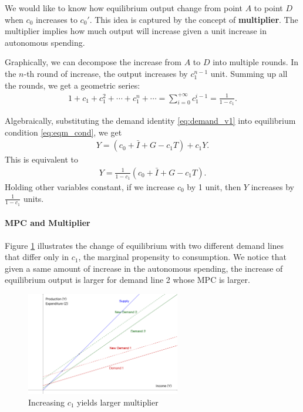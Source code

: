 \documentclass[12pt]{article}
\begin{document}
We would like to know how equilibrium output change from point $A$ to point $D$ when $c_0$ increases to $c_0'$. This idea is captured by the concept of \textbf{multiplier}. The multiplier implies how much output will increase given a unit increase in autonomous spending. 

Graphically, we can decompose the increase from $A$ to $D$ into multiple rounds. In the $n$-th round of increase, the output increases by $c_1^{n-1}$ unit. Summing up all the rounds, we get a geometric series:
\begin{align*}
    1 + c_1 + c_1^2 + \cdots + c_1^n + \cdots = \sum_{i=0}^{+\infty} c_1^{i-1} = \frac{1}{1-c_1}.
\end{align*}

Algebraically, substituting the demand identity \eqref{eq:demand_v1} into equilibrium condition \eqref{eq:eqm_cond}, we get
\begin{align*}
    Y = (c_0 + \bar{I} + G - c_1T) + c_1Y.
\end{align*}
This is equivalent to
\begin{align*}
    Y = \frac{1}{1-c_1} (c_0 + \bar{I} + G - c_1T).
\end{align*}
Holding other variables constant, if we increase $c_0$ by 1 unit, then $Y$ increases by $\frac{1}{1-c_1}$ units.

\paragraph{MPC and Multiplier}
Figure \ref{fig:key_cross_v3} illustrates the change of equilibrium with two different demand lines that differ only in $c_1$, the marginal propensity to consumption. We notice that given a same amount of increase in the autonomous spending, the increase of equilibrium output is larger for demand line 2 whose MPC is larger.

\begin{figure}[htp]
    \centering
    \includegraphics[width=0.6\textwidth]{keynesian_cross_c1change.png}
    \caption{Increasing $c_1$ yields larger multiplier}
    \label{fig:key_cross_v3}
\end{figure}
\end{document}
